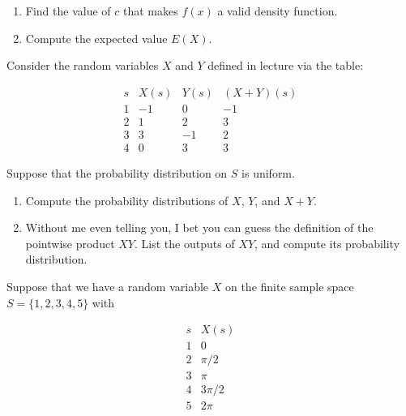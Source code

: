\documentclass[12pt,reqno]{amsart}
\begin{document}
\medskip
\begin{enumerate}
\item Find the value of $c$ that makes $f(x)$ a valid density function.\vfill
\item Compute the expected value $E(X)$.\vfill
\end{enumerate}















\newpage
\prob Consider the random variables $X$ and $Y$ defined in lecture via the table:

	\[
	\begin{array}{c|ccc}
	s & X(s) & Y(s) & (X+Y)(s) \\ \hline
	1 & -1 & 0 & -1 \\
	2 & 1 & 2 & 3 \\
	3 & 3 & -1 & 2 \\
	4 & 0 & 3 & 3
	\end{array}
	\]

Suppose that the probability distribution on $S$ is uniform.

\medskip
\begin{enumerate}
\item Compute the probability distributions of $X$, $Y$, and $X+Y$.\vfill
\item Without me even telling you, I bet you can guess the definition of the pointwise product $XY$. List the outputs of $XY$, and compute its probability distribution.\vfill
\end{enumerate}
    











\bigskip
\prob Suppose that we have a random variable $X$ on the finite sample space $S = \{1,2,3,4,5\}$ with

	\[\begin{array}{c|c}
	s & X(s)  \\ \hline
	1 & 0  \\
	2 & \pi/2  \\
	3 & \pi \\
	4 & 3\pi/2 \\
	5 & 2\pi
	\end{array}
	\]
\end{document}

